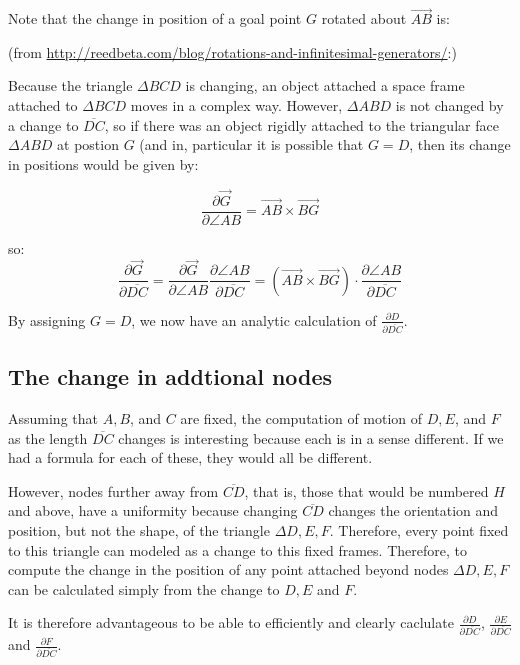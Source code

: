 \documentclass[11pt]{article}
\begin{document}
 Note that the change in position of a goal point $G$ rotated about $\overrightarrow{AB}$ is:

 (from \url{http://reedbeta.com/blog/rotations-and-infinitesimal-generators/}:)

 Because the triangle $\Delta BCD$ is changing, an object attached a space frame attached to $\Delta BCD$ moves in a complex way.
 However, $\Delta ABD$ is not changed by a change to $\overline{DC}$, so if there was an object rigidly attached to the triangular face $\Delta ABD$ at postion $G$ (and in, particular it is possible that $G = D$,
then its change in positions would be given by:

\begin{equation}
\frac{\partial \overrightarrow{G}}{\partial \angle AB} = \overrightarrow{AB} \times \overrightarrow{BG}
\end{equation}

so:
\begin{equation}
\frac{\partial \overrightarrow{G}}{\partial \overline{DC}} =  \frac{\partial \overrightarrow{G}}{\partial \angle AB } \frac{\partial \angle AB }{\partial \overline{DC}} = (\overrightarrow{AB} \times \overrightarrow{BG}) \cdot \frac{\partial \angle AB }{\partial \overline{DC}}
\end{equation}

By assigning $G = D$, we now have an analytic calculation of $\frac{\partial D}{\partial \overline{DC}}$.

\subsection{The change in addtional nodes}

Assuming that $A, B$, and $C$ are fixed, the computation of motion of $D,E$, and $F$ as the length $ \overline{DC} $ changes is interesting
because each is in a sense different. If we had a formula for each of these, they would all be different.

However, nodes further away from $\overline{CD}$, that is, those that would be numbered $H$ and above, have a uniformity because changing
$\overline{CD}$ changes the orientation and position, but not the shape, of the triangle $\Delta D, E, F$. Therefore, every point fixed
to this triangle can modeled as a change to this fixed frames. Therefore, to compute the change in the position of any point attached beyond
nodes $\Delta D, E, F$ can be calculated simply from the change to $D,E$ and $F$.

It is therefore advantageous to be able to efficiently and clearly caclulate
$\frac{\partial D}{\partial \overline{DC}}$,
$\frac{\partial E}{\partial \overline{DC}}$ and
$\frac{\partial F}{\partial \overline{DC}}$.
\end{document}
